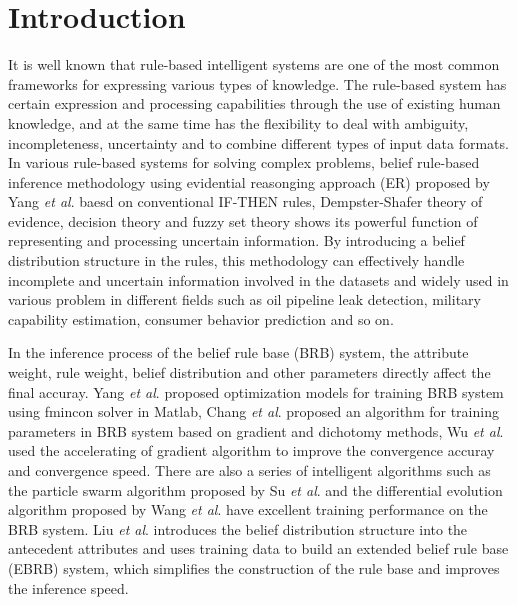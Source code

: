 \documentclass{ieeeaccess}
\begin{document}
\maketitle

\section{Introduction}
\label{sec:introduction}

It is well known that rule-based intelligent systems are one of the most common frameworks for expressing various types of knowledge.
The rule-based system has certain expression and processing capabilities through the use of existing human knowledge,
and at the same time has the flexibility to deal with ambiguity, incompleteness, uncertainty and to combine different types of input data formats.
In various rule-based systems for solving complex problems, belief rule-based inference methodology using evidential reasonging approach (ER) proposed by Yang \textit{et al}.\cite{a1}
baesd on conventional IF-THEN rules\cite{a2}, Dempster-Shafer theory of evidence\cite{a3,a4}, decision theory\cite{a5}
and fuzzy set theory\cite{a6} shows its powerful function of representing and processing uncertain information.
By introducing a belief distribution structure in the rules,
this methodology can effectively handle incomplete and uncertain information involved in the datasets and
widely used in various problem in different fields such as
oil pipeline leak detection\cite{a7}, military capability estimation\cite{a8}, consumer behavior prediction\cite{a9} and so on.

In the inference process of the belief rule base (BRB) system, the attribute weight, rule weight, belief distribution and other parameters
directly affect the final accuray. Yang \textit{et al}.\cite{a10} proposed optimization models for training BRB system using fmincon solver in
Matlab, Chang \textit{et al}.\cite{a11,a12} proposed an algorithm for training parameters in BRB system based on gradient and dichotomy methods,
Wu \textit{et al}.\cite{a13} used the accelerating of gradient algorithm to improve the convergence accuray and convergence speed. There are also
a series of intelligent algorithms such as the particle swarm algorithm proposed by Su \textit{et al}.\cite{a14} and the differential evolution
algorithm proposed by Wang \textit{et al}.\cite{a15} have excellent training performance on the BRB system.
Liu \textit{et al}.\cite{a16} introduces the belief distribution structure into the antecedent attributes and
uses training data to build an extended belief rule base (EBRB) system,
which simplifies the construction of the rule base and improves the inference speed.
\end{document}
